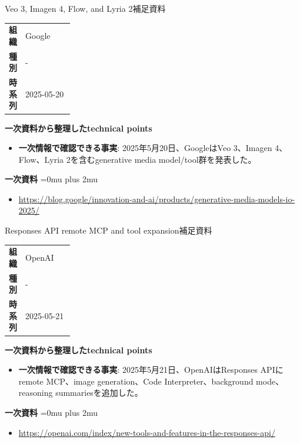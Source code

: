 \begin{technicalnote}{Veo 3, Imagen 4, Flow, and Lyria 2}{補足資料}
\begingroup
\begin{tabularx}{\linewidth}{@{}>{\bfseries}p{0.22\linewidth}X@{}}
組織 & Google \\
種別 & - \\
時系列 & 2025-05-20 \\
\end{tabularx}
\smallskip
{\bfseries 一次資料から整理したtechnical points}
\begin{itemize}[leftmargin=1.5em,itemsep=0.35em]
\item \textbf{一次情報で確認できる事実}: 2025年5月20日、GoogleはVeo 3、Imagen 4、Flow、Lyria 2を含むgenerative media model/tool群を発表した。
\end{itemize}
\begin{samepage}
{\bfseries 一次資料}
\begingroup\sloppy
\Urlmuskip=0mu plus 2mu\relax
\begin{itemize}[leftmargin=1.5em,itemsep=0.25em]
\item {\scriptsize\url{https://blog.google/innovation-and-ai/products/generative-media-models-io-2025/}}
\end{itemize}
\endgroup
\end{samepage}
\endgroup
\end{technicalnote}
\medskip

\begin{technicalnote}{Responses API remote MCP and tool expansion}{補足資料}
\begingroup
\begin{tabularx}{\linewidth}{@{}>{\bfseries}p{0.22\linewidth}X@{}}
組織 & OpenAI \\
種別 & - \\
時系列 & 2025-05-21 \\
\end{tabularx}
\smallskip
{\bfseries 一次資料から整理したtechnical points}
\begin{itemize}[leftmargin=1.5em,itemsep=0.35em]
\item \textbf{一次情報で確認できる事実}: 2025年5月21日、OpenAIはResponses APIにremote MCP、image generation、Code Interpreter、background mode、reasoning summariesを追加した。
\end{itemize}
\begin{samepage}
{\bfseries 一次資料}
\begingroup\sloppy
\Urlmuskip=0mu plus 2mu\relax
\begin{itemize}[leftmargin=1.5em,itemsep=0.25em]
\item {\scriptsize\url{https://openai.com/index/new-tools-and-features-in-the-responses-api/}}
\end{itemize}
\endgroup
\end{samepage}
\endgroup
\end{technicalnote}
\medskip

